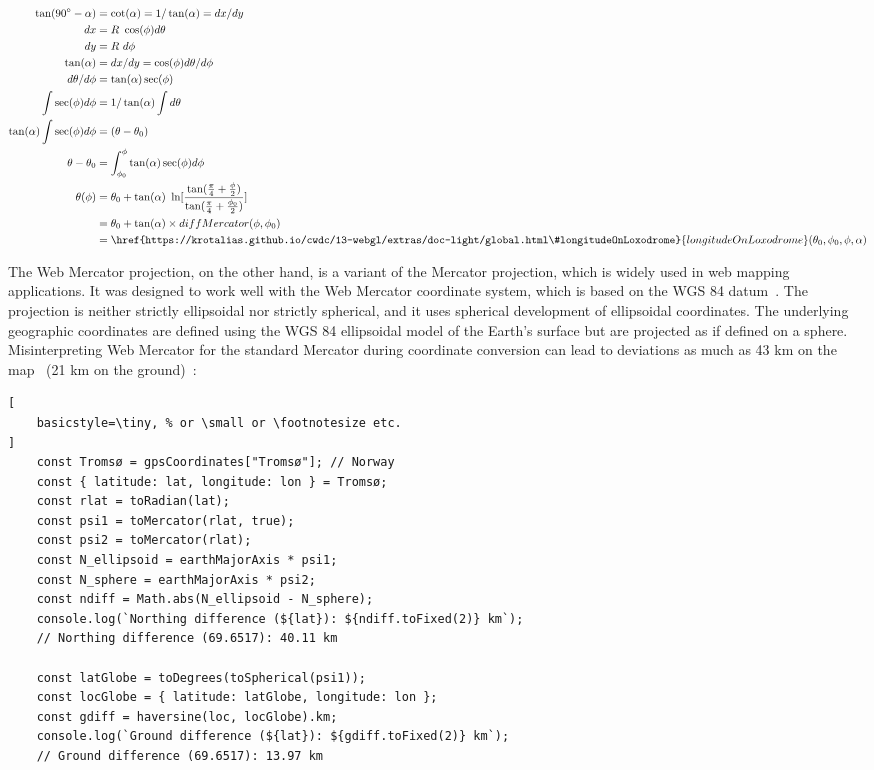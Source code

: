 \documentclass[conference]{IEEEtran}
\begin{document}
\begin{equation}
\begin{split}
 \tan(90^\circ - \alpha) &= \cot(\alpha) = 1/\tan(\alpha) = dx/dy \\
 dx &= R\ \cos(\phi) d\theta \\
 dy &= R\ d\phi \\
 \tan(\alpha) &= dx/dy = \cos(\phi) d\theta/d\phi \\
 d\theta/d\phi &= \tan(\alpha) \sec(\phi) \\
 \int \sec(\phi) d\phi &= 1/\tan(\alpha) \int d\theta \\
 \tan(\alpha) \int \sec(\phi) d\phi &= (\theta - \theta_{0}) \\
 \theta - \theta_{0} &= \int_{\phi_{0}}^{\phi} \tan(\alpha) \sec(\phi) d\phi \\
 \theta(\phi) &= \theta_{0} + \tan(\alpha)\ \ln [\frac{\tan (\frac{\pi}{4} + \frac{\phi}{2})} {\tan (\frac{\pi}{4} + \frac{\phi_{0}}{2})}] \\
 &= \theta_{0} + \tan(\alpha) \times diffMercator(\phi, \phi_{0}) \\
 &= \href{https://krotalias.github.io/cwdc/13-webgl/extras/doc-light/global.html\#longitudeOnLoxodrome}{longitudeOnLoxodrome}(\theta_{0}, \phi_{0}, \phi, \alpha)
\end{split}
\end{equation}

The Web Mercator projection, on the other hand, is a variant of the Mercator projection,
which is widely used in web mapping applications.
It was designed to work well with the Web Mercator coordinate system,
which is based on the WGS 84 datum~\cite{wgs84}. The projection is neither strictly ellipsoidal nor strictly spherical,
and it uses spherical development of ellipsoidal coordinates.
The underlying geographic coordinates are defined using the WGS 84 ellipsoidal model
of the Earth's surface but are projected as if defined on a sphere.
Misinterpreting Web Mercator for the standard Mercator during coordinate conversion
can lead to deviations as much as 43 km on the map~\cite{stefanakis2017web} (21 km on the ground)~\cite{EPSG3857}:

\newpage
\begin{lstlisting}[
    basicstyle=\tiny, % or \small or \footnotesize etc.
]
    const Tromsø = gpsCoordinates["Tromsø"]; // Norway
    const { latitude: lat, longitude: lon } = Tromsø;
    const rlat = toRadian(lat);
    const psi1 = toMercator(rlat, true);
    const psi2 = toMercator(rlat);
    const N_ellipsoid = earthMajorAxis * psi1;
    const N_sphere = earthMajorAxis * psi2;
    const ndiff = Math.abs(N_ellipsoid - N_sphere);
    console.log(`Northing difference (${lat}): ${ndiff.toFixed(2)} km`);
    // Northing difference (69.6517): 40.11 km

    const latGlobe = toDegrees(toSpherical(psi1));
    const locGlobe = { latitude: latGlobe, longitude: lon };
    const gdiff = haversine(loc, locGlobe).km;
    console.log(`Ground difference (${lat}): ${gdiff.toFixed(2)} km`);
    // Ground difference (69.6517): 13.97 km
\end{lstlisting}
\end{document}
